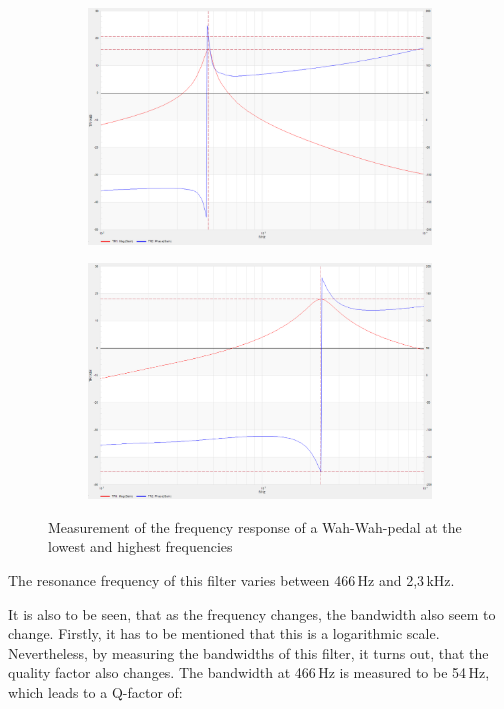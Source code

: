 \begin{figure}[!h]
    \centering
    \begin{subfigure}[c]{0.45\textwidth}
        \centering
        \includegraphics[width=\textwidth]{img/wahwah-1.png}
    \end{subfigure}
    \begin{subfigure}[c]{0.45\textwidth}
        \centering
        \includegraphics[width=\textwidth]{img/wahwah-2.png}
    \end{subfigure}
    \caption{Measurement of the frequency response of a Wah-Wah-pedal at the lowest and highest frequencies}
    \label{fig:wahwah-filter}
\end{figure}

The resonance frequency of this filter varies between 466\,Hz and 2,3\,kHz.

It is also to be seen, that as the frequency changes, the bandwidth also seem to change. Firstly, it has to be mentioned
that this is a logarithmic scale. Nevertheless, by measuring the bandwidths of this filter, it turns out, that the quality
factor also changes.
The bandwidth at 466\,Hz is measured to be 54\,Hz, which leads to a Q-factor of:

